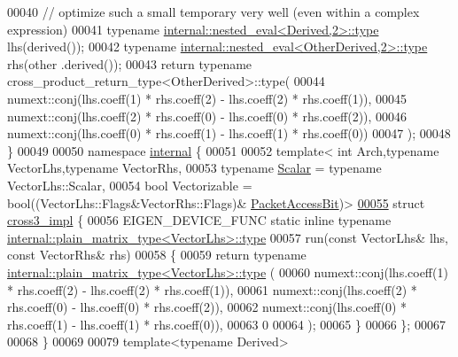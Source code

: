 \begin{DoxyCode}
00040   \textcolor{comment}{// optimize such a small temporary very well (even within a complex expression)}
00041   \textcolor{keyword}{typename} \hyperlink{class_eigen_1_1internal_1_1_tensor_lazy_evaluator_writable}{internal::nested\_eval<Derived,2>::type} lhs(derived());
00042   \textcolor{keyword}{typename} \hyperlink{class_eigen_1_1internal_1_1_tensor_lazy_evaluator_writable}{internal::nested\_eval<OtherDerived,2>::type} rhs(other
      .derived());
00043   \textcolor{keywordflow}{return} \textcolor{keyword}{typename} cross\_product\_return\_type<OtherDerived>::type(
00044     numext::conj(lhs.coeff(1) * rhs.coeff(2) - lhs.coeff(2) * rhs.coeff(1)),
00045     numext::conj(lhs.coeff(2) * rhs.coeff(0) - lhs.coeff(0) * rhs.coeff(2)),
00046     numext::conj(lhs.coeff(0) * rhs.coeff(1) - lhs.coeff(1) * rhs.coeff(0))
00047   );
00048 \}
00049 
00050 \textcolor{keyword}{namespace }\hyperlink{namespaceinternal}{internal} \{
00051 
00052 \textcolor{keyword}{template}< \textcolor{keywordtype}{int} Arch,\textcolor{keyword}{typename} VectorLhs,\textcolor{keyword}{typename} VectorRhs,
00053           \textcolor{keyword}{typename} \hyperlink{group___core___module_a5feed465b3a8e60c47e73ecce83e39a2}{Scalar} = \textcolor{keyword}{typename} VectorLhs::Scalar,
00054           \textcolor{keywordtype}{bool} Vectorizable = bool((VectorLhs::Flags&VectorRhs::Flags)&
      \hyperlink{group__flags_ga1a306a438e1ab074e8be59512e887b9f}{PacketAccessBit})>
\hyperlink{struct_eigen_1_1internal_1_1cross3__impl}{00055} \textcolor{keyword}{struct }\hyperlink{struct_eigen_1_1internal_1_1cross3__impl}{cross3\_impl} \{
00056   EIGEN\_DEVICE\_FUNC \textcolor{keyword}{static} \textcolor{keyword}{inline} \textcolor{keyword}{typename} 
      \hyperlink{struct_eigen_1_1internal_1_1plain__matrix__type}{internal::plain\_matrix\_type<VectorLhs>::type}
00057   run(\textcolor{keyword}{const} VectorLhs& lhs, \textcolor{keyword}{const} VectorRhs& rhs)
00058   \{
00059     \textcolor{keywordflow}{return} \textcolor{keyword}{typename} \hyperlink{struct_eigen_1_1internal_1_1plain__matrix__type}{internal::plain\_matrix\_type<VectorLhs>::type}
      (
00060       numext::conj(lhs.coeff(1) * rhs.coeff(2) - lhs.coeff(2) * rhs.coeff(1)),
00061       numext::conj(lhs.coeff(2) * rhs.coeff(0) - lhs.coeff(0) * rhs.coeff(2)),
00062       numext::conj(lhs.coeff(0) * rhs.coeff(1) - lhs.coeff(1) * rhs.coeff(0)),
00063       0
00064     );
00065   \}
00066 \};
00067 
00068 \}
00069 
00079 \textcolor{keyword}{template}<\textcolor{keyword}{typename} Derived>

\end{DoxyCode}
